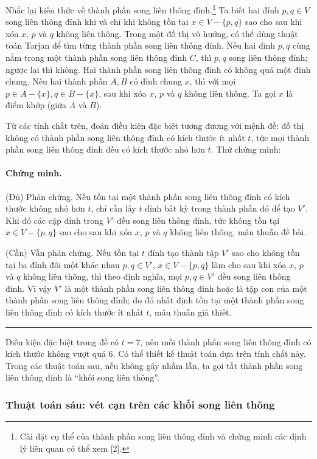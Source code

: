 \documentclass[11pt]{article}
\newcommand{\qedmark}{\hfill\rule{0.7ex}{0.7ex}}
\begin{document}
Nhắc lại kiến thức về thành phần song liên thông đỉnh.\footnote{Cài đặt cụ
thể của thành phần song liên thông đỉnh và chứng minh các định lý liên quan
có thể xem [2].} Ta biết hai đỉnh \(p,q\in V\) song liên thông đỉnh khi và chỉ
khi không tồn tại \(x\in V-\{p,q\}\) sao cho sau khi xóa \(x\), \(p\) và \(q\)
không liên thông. Trong một đồ thị vô hướng, có thể dùng thuật toán Tarjan để
tìm từng thành phần song liên thông đỉnh. Nếu hai đỉnh \(p,q\) cùng nằm trong
một thành phần song liên thông đỉnh \(C\), thì \(p,q\) song liên thông đỉnh;
ngược lại thì không. Hai thành phần song liên thông đỉnh có không quá một đỉnh
chung. Nếu hai thành phần \(A,B\) có đỉnh chung \(x\), thì với mọi
\(p\in A-\{x\},q\in B-\{x\}\), sau khi xóa \(x\), \(p\) và \(q\) không liên
thông. Ta gọi \(x\) là điểm khớp (giữa \(A\) và \(B\)).

Từ các tính chất trên, đoán điều kiện đặc biệt tương đương với mệnh đề: đồ thị
không có thành phần song liên thông đỉnh có kích thước ít nhất \(t\), tức mọi
thành phần song liên thông đỉnh đều có kích thước nhỏ hơn \(t\). Thử chứng
minh:

\paragraph{Chứng minh.}
(Đủ) Phản chứng. Nếu tồn tại một thành phần song liên thông đỉnh có kích thước
không nhỏ hơn \(t\), chỉ cần lấy \(t\) đỉnh bất kỳ trong thành phần đó để tạo
\(V'\). Khi đó các cặp đỉnh trong \(V'\) đều song liên thông đỉnh, tức không
tồn tại \(x\in V-\{p,q\}\) sao cho sau khi xóa \(x\), \(p\) và \(q\) không
liên thông, mâu thuẫn đề bài.

(Cần) Vẫn phản chứng. Nếu tồn tại \(t\) đỉnh tạo thành tập \(V'\) sao cho
không tồn tại ba đỉnh đôi một khác nhau \(p,q\in V'\), \(x\in V-\{p,q\}\) làm
cho sau khi xóa \(x\), \(p\) và \(q\) không liên thông, thì theo định nghĩa,
mọi \(p,q\in V'\) đều song liên thông đỉnh. Vì vậy \(V'\) là một thành phần
song liên thông đỉnh hoặc là tập con của một thành phần song liên thông đỉnh;
do đó nhất định tồn tại một thành phần song liên thông đỉnh có kích thước ít
nhất \(t\), mâu thuẫn giả thiết. \qedmark

Điều kiện đặc biệt trong đề có \(t=7\), nên mỗi thành phần song liên thông
đỉnh có kích thước không vượt quá \(6\). Có thể thiết kế thuật toán dựa trên
tính chất này. Trong các thuật toán sau, nếu không gây nhầm lẫn, ta gọi tắt
thành phần song liên thông đỉnh là ``khối song liên thông''.

\subsubsection{Thuật toán sáu: vét cạn trên các khối song liên thông}
\end{document}
